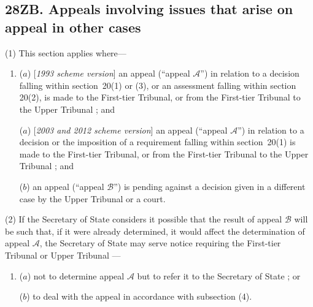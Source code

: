 \documentclass[12pt,a4paper]{article}
\begin{document}
\subsection{28ZB. Appeals involving issues that arise on appeal in other cases}

(1) This section applies where—
\begin{enumerate}\item[]
($a$) [\emph{1993 scheme version}] an appeal (“appeal $\mathcal{A}$”) in relation to a decision falling within section~20(1) or (3), or an assessment falling within section 20(2), is made to 
the First-tier Tribunal, or from the First-tier Tribunal to the Upper Tribunal%
; and

($a$) [\emph{2003 and 2012 scheme version}] an appeal (“appeal $\mathcal{A}$”) in relation to a decision or the imposition of a requirement falling within section~20(1)  is made to 
the First-tier Tribunal, or from the First-tier Tribunal to the Upper Tribunal%
;
and

($b$) an appeal (“appeal $\mathcal{B}$”) is pending against a decision given in a different case by 
the Upper Tribunal  %
or a court.
\end{enumerate}

(2) If the 
Secretary of State  %
considers it possible that the result of appeal $\mathcal{B}$ will be such that, if it were already determined, it would affect the determination of appeal $\mathcal{A}$, 
the 
Secretary of State  %
may serve notice requiring the 
First-tier Tribunal or Upper Tribunal%
—
\begin{enumerate}\item[]
($a$) not to determine appeal $\mathcal{A}$ but to refer it to 
the 
Secretary of State%
; or

($b$) to deal with the appeal in accordance with subsection (4).
\end{enumerate}
\end{document}
